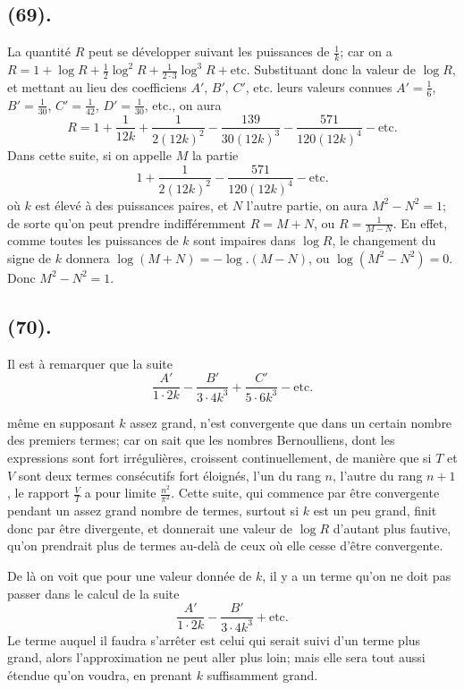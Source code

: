 \documentclass{article}
\begin{document}
\subsection*{(69).}

La quantité $R$ peut se développer suivant les puissances de $\frac{1}{k}$; car on a $R=1+\log R+\frac{1}{2}\log^{2}R+\frac{1}{2\cdot3}\log^{3}R+\text{etc.}$ Substituant donc la valeur de $\log R$, et mettant au lieu des coefficiens $A'$, $B'$, $C'$, etc. leurs valeurs connues $A'=\frac{1}{6}$, $B'=\frac{1}{30}$, $C'=\frac{1}{42}$, $D'=\frac{1}{30}$, etc., on aura
\[ R=1+\frac{1}{12k}+\frac{1}{2(12k)^{2}}-\frac{139}{30(12k)^{3}}-\frac{571}{120(12k)^{4}}-\text{etc.} \]
Dans cette suite, si on appelle $M$ la partie
\[ 1+\frac{1}{2(12k)^{2}}-\frac{571}{120(12k)^{4}}-\text{etc.} \]
où $k$ est élevé à des puissances paires, et $N$ l'autre partie, on aura $M^{2}-N^{2}=1$; de sorte qu'on peut prendre indifféremment $R=M+N$, ou $R=\frac{1}{M-N}$. En effet, comme toutes les puissances de $k$ sont impaires dans $\log R$, le changement du signe de $k$ donnera $\log(M+N)=-\log.(M-N)$, ou $\log(M^{2}-N^{2})=0$. Donc $M^{2}-N^{2}=1$.

\subsection*{(70).}

Il est à remarquer que la suite
\[ \frac{A'}{1\cdot2k}-\frac{B'}{3\cdot4k^{3}}+\frac{C'}{5\cdot6k^{3}}-\text{etc.} \]

même en supposant $k$ assez grand, n'est convergente que dans un certain nombre des premiers termes; car on sait que les nombres Bernoulliens, dont les expressions sont fort irrégulières, croissent continuellement, de manière que si $T$ et $V$ sont deux termes consécutifs fort éloignés, l'un du rang $n$, l'autre du rang $n+1$, le rapport $\frac{V}{T}$ a pour limite $\frac{n^{2}}{\pi^{2}}$. Cette suite, qui commence par être convergente pendant un assez grand nombre de termes, surtout si $k$ est un peu grand, finit donc par être divergente, et donnerait une valeur de $\log R$ d'autant plus fautive, qu'on prendrait plus de termes au-delà de ceux où elle cesse d'être convergente.

De là on voit que pour une valeur donnée de $k$, il y a un terme qu'on ne doit pas passer dans le calcul de la suite
\[ \frac{A'}{1\cdot2k}-\frac{B'}{3\cdot4k^{3}}+\text{etc.} \]
Le terme auquel il faudra s'arrêter est celui qui serait suivi d'un terme plus grand, alors l'approximation ne peut aller plus loin; mais elle sera tout aussi étendue qu'on voudra, en prenant $k$ suffisamment grand.
\end{document}
